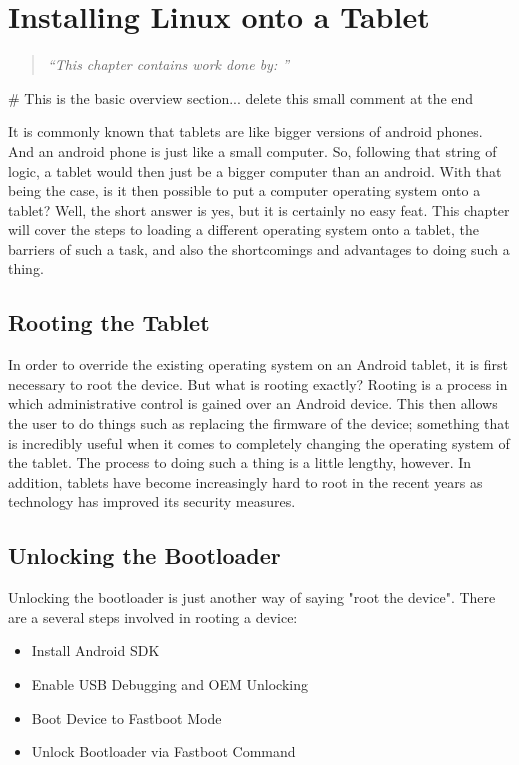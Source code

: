 \chapter{Installing Linux onto a Tablet}
\begin{quote}\it
``This chapter contains work done by: ''
\end{quote}
\label{chapter: Installing Linux onto a Tablet}

# This is the basic overview section... delete this small comment at the end

It is commonly known that tablets are like bigger versions of android phones. And an android phone is just like a small computer. So, following that string of logic, a tablet would then 
just be a bigger computer than an android. With that being the case, is it then possible to put a computer operating system onto a tablet? Well, the short answer is yes, but it is certainly 
no easy feat. This chapter will cover the steps to loading a different operating system onto a tablet, the barriers of such a task, and also the shortcomings and advantages to doing such 
a thing. 

\section{Rooting the Tablet}
In order to override the existing operating system on an Android tablet, it is first necessary to root the device. But what is rooting exactly? Rooting is a process in which 
administrative control is gained over an Android device. This then allows the user to do things such as replacing the firmware of the device; something that is incredibly
useful when it comes to completely changing the operating system of the tablet. The process to doing such a thing is a little lengthy, however. In addition, tablets
have become increasingly hard to root in the recent years as technology has improved its security measures.

\section{Unlocking the Bootloader}
Unlocking the bootloader is just another way of saying "root the device". There are a several steps involved in rooting a device:
\begin{itemize}

\item Install Android SDK
\item Enable USB Debugging and OEM Unlocking
\item Boot Device to Fastboot Mode
\item Unlock Bootloader via Fastboot Command

\end{itemize}

